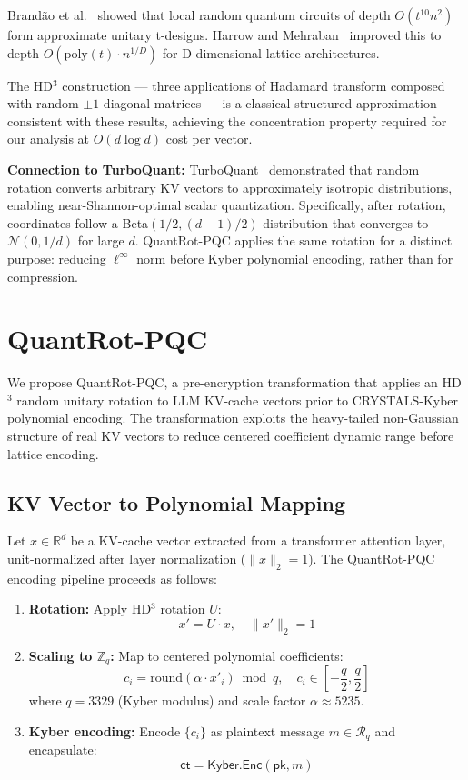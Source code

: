 \documentclass[preprint,a4paper]{article}
\begin{document}
Brandão et al.~\cite{brandao2016} showed that local
random quantum circuits of depth $O(t^{10} n^2)$ form
approximate unitary t-designs. Harrow and
Mehraban~\cite{harrow2018} improved this to depth
$O(\text{poly}(t) \cdot n^{1/D})$ for D-dimensional
lattice architectures.

The HD$^3$ construction --- three applications of
Hadamard transform composed with random $\pm 1$ diagonal
matrices --- is a classical structured approximation
consistent with these results, achieving the
concentration property required for our analysis at
$O(d \log d)$ cost per vector.

\textbf{Connection to TurboQuant:}
TurboQuant~\cite{turboquant2025} demonstrated that random
rotation converts arbitrary KV vectors to approximately
isotropic distributions, enabling near-Shannon-optimal
scalar quantization. Specifically, after rotation,
coordinates follow a Beta$(1/2, (d-1)/2)$ distribution
that converges to $\mathcal{N}(0, 1/d)$ for large $d$.
QuantRot-PQC applies the same rotation for a distinct
purpose: reducing $\ell^\infty$ norm before Kyber
polynomial encoding, rather than for compression.

\section{QuantRot-PQC}
\label{sec:method}

We propose QuantRot-PQC, a pre-encryption transformation
that applies an HD$^3$ random unitary rotation to LLM
KV-cache vectors prior to CRYSTALS-Kyber polynomial
encoding. The transformation exploits the heavy-tailed
non-Gaussian structure of real KV vectors to reduce
centered coefficient dynamic range before lattice encoding.

\subsection{KV Vector to Polynomial Mapping}
\label{sec:mapping}

Let $x \in \mathbb{R}^d$ be a KV-cache vector extracted
from a transformer attention layer, unit-normalized after
layer normalization ($\|x\|_2 = 1$). The QuantRot-PQC
encoding pipeline proceeds as follows:

\begin{enumerate}
    \item \textbf{Rotation:} Apply HD$^3$ rotation $U$:
    \[
        x' = U \cdot x, \quad \|x'\|_2 = 1
    \]

    \item \textbf{Scaling to $\mathbb{Z}_q$:} Map to
    centered polynomial coefficients:
    \[
        c_i = \text{round}(\alpha \cdot x'_i) \bmod q,
        \quad c_i \in \left[-\frac{q}{2}, \frac{q}{2}\right]
    \]
    where $q = 3329$ (Kyber modulus) and scale factor
    $\alpha \approx 5235$.

    \item \textbf{Kyber encoding:} Encode $\{c_i\}$ as
    plaintext message $m \in \mathcal{R}_q$ and encapsulate:
    \[
        \mathsf{ct} = \mathsf{Kyber.Enc}(\mathsf{pk}, m)
    \]
\end{enumerate}
\end{document}

